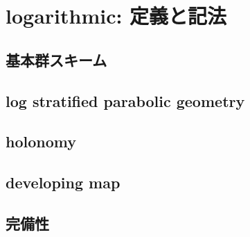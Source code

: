 
\section{logarithmic: 定義と記法}

\subsection{基本群スキーム}

\subsection{log stratified parabolic geometry}

\subsection{holonomy}

\subsection{developing map}

\subsection{完備性}
